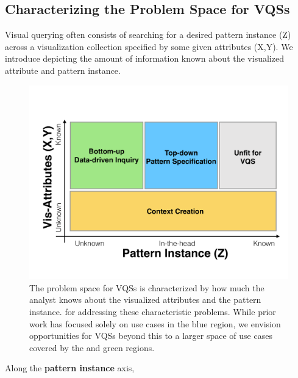 \subsection{Characterizing the Problem Space for VQSs}
 Visual querying often consists of searching for a desired pattern instance (Z) across a visualization collection specified by some given attributes (X,Y). We introduce  depicting the amount of information known about the visualized attribute and pattern instance.%
\begin{figure}[h!]
  \centering
  \includegraphics[width=0.9\linewidth]{figures/2dmodel.pdf}
  \caption{The problem space for VQSs is characterized by how much the analyst knows about the visualized attributes and the pattern instance.  for addressing these characteristic problems. While prior work has focused solely on use cases in the blue region, we envision opportunities for VQSs beyond this to a larger space of use cases covered by the  and green regions.}
  \label{2dmodel}
  \vspace{-10pt}
\end{figure}
\par Along the \textbf{pattern instance} axis, 
